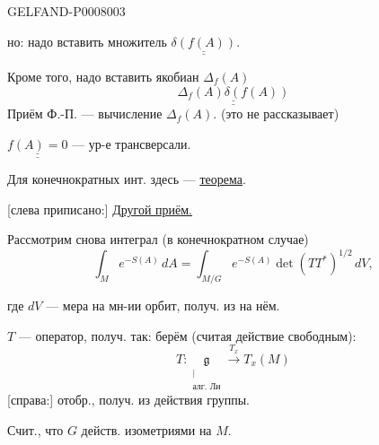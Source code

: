 \begin{GelfandAdjacentEvidence}{GELFAND-P000800}{3}


но: надо вставить множитель \(\underline{\underline{\delta(f(A))}}\).

Кроме того, надо вставить якобиан \(\Delta_f(A)\)
\begin{equation*}
\underline{\underline{\Delta_f(A)\delta(f(A))}}
\tag{8}
\end{equation*}
Приём Ф.-П. --- вычисление \(\Delta_f(A)\). (это не рассказывает)

\(\underline{\underline{f(A)=0}}\) --- ур-е трансверсали.

Для конечнократных инт. здесь --- \underline{\underline{теорема}}.

[слева приписано:] \underline{Другой приём.}

Рассмотрим снова интеграл (в конечнократном случае)
\begin{equation*}
\int_M e^{-S(A)}\,dA
=\int_{M/G}e^{-S(A)}\det(TT^*)^{1/2}\,dV,
\tag{9}
\end{equation*}
\end{GelfandAdjacentEvidence}


где \(dV\) --- мера на мн-ии орбит, получ. из  на нём.

\(T\) --- оператор, получ. так: берём (считая действие свободным):
\[
T:\underset{\substack{\vert\\\text{алг. Ли}}}{\mathfrak g}
\xrightarrow{T_x}T_x(M)
\]
[справа:] отобр., получ. из действия группы.

Счит., что \(G\) действ. изометриями на \(M\).


